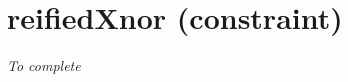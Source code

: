 \section{reifiedXnor (constraint)}\label{reifiedxnor:reifiedxnorconstraint}\hypertarget{reifiedxnor:reifiedxnorconstraint}{}
\emph{To complete}
